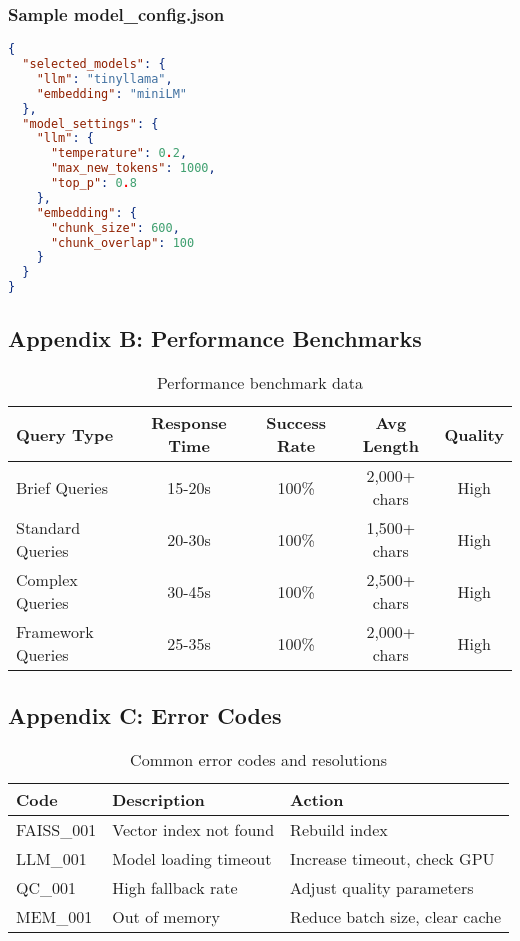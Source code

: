 \documentclass[12pt,a4paper]{article}
\begin{document}
\subsubsection{Sample model\_config.json}
\begin{lstlisting}[language=json]
{
  "selected_models": {
    "llm": "tinyllama",
    "embedding": "miniLM"
  },
  "model_settings": {
    "llm": {
      "temperature": 0.2,
      "max_new_tokens": 1000,
      "top_p": 0.8
    },
    "embedding": {
      "chunk_size": 600,
      "chunk_overlap": 100
    }
  }
}
\end{lstlisting}

\subsection{Appendix B: Performance Benchmarks}

\begin{table}[H]
\centering
\begin{tabular}{@{}lcccc@{}}
\toprule
\textbf{Query Type} & \textbf{Response Time} & \textbf{Success Rate} & \textbf{Avg Length} & \textbf{Quality} \\
\midrule
Brief Queries & 15-20s & 100\% & 2,000+ chars & High \\
Standard Queries & 20-30s & 100\% & 1,500+ chars & High \\
Complex Queries & 30-45s & 100\% & 2,500+ chars & High \\
Framework Queries & 25-35s & 100\% & 2,000+ chars & High \\
\bottomrule
\end{tabular}
\caption{Performance benchmark data}
\end{table}

\subsection{Appendix C: Error Codes}

\begin{table}[H]
\centering
\begin{tabular}{@{}lll@{}}
\toprule
\textbf{Code} & \textbf{Description} & \textbf{Action} \\
\midrule
FAISS\_001 & Vector index not found & Rebuild index \\
LLM\_001 & Model loading timeout & Increase timeout, check GPU \\
QC\_001 & High fallback rate & Adjust quality parameters \\
MEM\_001 & Out of memory & Reduce batch size, clear cache \\
\bottomrule
\end{tabular}
\caption{Common error codes and resolutions}
\end{table}
\end{document}
